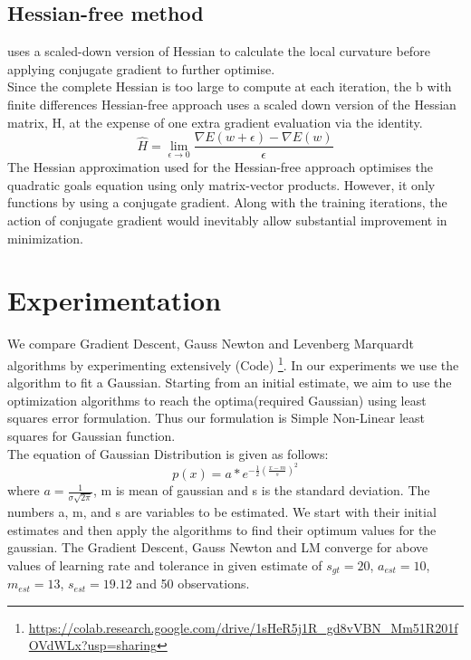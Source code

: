 \documentclass[journal]{IEEEtran}
\begin{document}
\subsection{Hessian-free method}
\cite{martens2010deep} uses a scaled-down version of Hessian to calculate the local curvature before applying conjugate gradient to further optimise. \\
Since the complete Hessian is too large to compute at each iteration, the b with finite differences Hessian-free approach uses a scaled down version of the Hessian matrix, H, at the expense of one extra gradient evaluation via the identity. \\
$$ \hat{H}=\lim _{\epsilon \rightarrow 0} \frac{\nabla E(w+\epsilon)-\nabla E(w)}{\epsilon} $$ 
The Hessian approximation used for the Hessian-free approach optimises the quadratic goals equation using only matrix-vector products. However, it only functions by using a conjugate gradient. Along with the training iterations, the action of conjugate gradient would inevitably allow substantial improvement in minimization.

\section{Experimentation}
We compare Gradient Descent, Gauss Newton and Levenberg Marquardt algorithms by experimenting extensively (Code) \footnote{\url{https://colab.research.google.com/drive/1sHeR5j1R_gd8vVBN_Mm51R201fOVdWLx?usp=sharing}}. In our experiments we use the algorithm to fit a Gaussian. Starting from an initial estimate, we aim to use the optimization algorithms to reach the optima(required Gaussian) using least squares error formulation.
Thus our formulation is Simple Non-Linear least squares for Gaussian function. \\
The equation of Gaussian Distribution is given as follows: 
$$ p(x)= a* e^{-\frac{1}{2}\left(\frac{x-m}{s}\right)^{2}} $$
where $a = \frac{1}{\sigma \sqrt{2 \pi}}$, m is mean of gaussian and s is the standard deviation.
The numbers a, m, and s are variables to be estimated.
We start with their initial estimates and then apply the algorithms to find their optimum values for the gaussian.
The Gradient Descent, Gauss Newton and LM converge for above values of learning rate and tolerance in given estimate of $s_{gt} = 20$, $a_{est} = 10$, $m_{est} = 13$, $s_{est} = 19.12$ and 50 observations.
\end{document}
